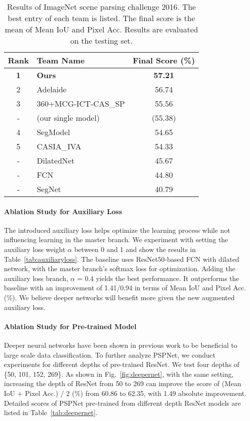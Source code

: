 \documentclass[10pt,twocolumn,letterpaper]{article}
\begin{document}
\begin{table}
\footnotesize
\begin{center}
\begin{tabular}{ c l c}
\hline
Rank & Team Name & Final Score (\%) \\
\hline\hline
\textbf{1} & \textbf{Ours} & \textbf{57.21} \\
2 & Adelaide & 56.74 \\
3 & 360+MCG-ICT-CAS\_SP & 55.56 \\
- & (our single model)  & (55.38) \\
4 & SegModel & 54.65 \\
5 & CASIA\_IVA & 54.33 \\
\hline
- & DilatedNet~\cite{yu2015multi} & 45.67 \\
- & FCN~\cite{long2015fully} & 44.80 \\
- & SegNet~\cite{badrinarayanan2015segnet} & 40.79 \\
\hline
\end{tabular}
\end{center}
\caption{Results of ImageNet scene parsing challenge 2016. The best entry of each team is
listed. The final score is the mean of Mean IoU and Pixel Acc. Results are evaluated on
the testing set. } \label{tab:imagenetscore}
\end{table}

\vspace{-0.1in}
\paragraph{Ablation Study for Auxiliary Loss}
The introduced auxiliary loss helps optimize the learning process while not influencing
learning in the master branch. We experiment with setting the auxiliary loss weight
$\alpha$ between 0 and 1 and show the results in Table~\ref{tab:auxiliaryloss}. The
baseline uses ResNet50-based FCN with dilated network, with the master branch's softmax
loss for optimization. Adding the auxiliary loss branch, $\alpha$ = 0.4 yields the best
performance. It outperforms the baseline with an improvement of 1.41/0.94 in terms of
Mean IoU and Pixel Acc. (\%). We believe deeper networks will benefit more given the new
augmented auxiliary loss.

\vspace{-0.1in}
\paragraph{Ablation Study for Pre-trained Model}
Deeper neural networks have been shown in previous work to be beneficial to large scale data
classification. To further analyze PSPNet, we conduct experiments for different depths of
pre-trained ResNet. We test four depths of \{50, 101, 152, 269\}. As shown in
Fig.~\ref{fig:deepernet}, with the same setting, increasing the depth of ResNet from 50
to 269 can improve the score of (Mean IoU + Pixel Acc.) / 2 (\%) from 60.86 to 62.35,
with 1.49 absolute improvement. Detailed scores of PSPNet pre-trained from different depth
ResNet models are listed in Table~\ref{tab:deepernet}.
\end{document}
